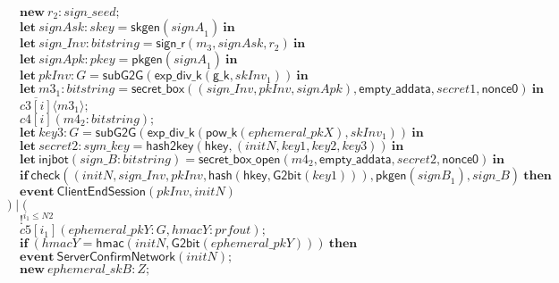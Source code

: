\documentclass{article}
\newcommand{\cinput}[2]{{#1}({#2})}
\newcommand{\coutput}[2]{\overline{#1}\langle{#2}\rangle}
\newcommand{\kw}[1]{\mathbf{#1}}
\newcommand{\kwf}[1]{\mathsf{#1}}
\newcommand{\var}[1]{\mathit{#1}}
\newcommand{\kwt}[1]{\mathit{#1}}
\newcommand{\kwp}[1]{\mathit{#1}}
\newcommand{\kwc}[1]{\mathit{#1}}
\begin{document}
\begin{tabbing}
\>$\quad \kw{new}\ \var{r}_{2}: \kwt{sign{\_}seed};$\\
\>$\quad \kw{let}\ \var{signAsk}: \kwt{skey} = \kwf{skgen}(\var{signA}_{1})\ \kw{in}$\\
\>$\quad \kw{let}\ \var{sign{\_}Inv}: \kwt{bitstring} = \kwf{sign{\_}r}(\var{m}_{3}, \var{signAsk}, \var{r}_{2})\ \kw{in}$\\
\>$\quad \kw{let}\ \var{signApk}: \kwt{pkey} = \kwf{pkgen}(\var{signA}_{1})\ \kw{in}$\\
\>$\quad \kw{let}\ \var{pkInv}: \kwt{G} = \kwf{subG2G}(\kwf{exp{\_}div{\_}k}(\kwf{g{\_}k}, \var{skInv}_{1}))\ \kw{in}$\\
\>$\quad \kw{let}\ \var{m3}_{1}: \kwt{bitstring} = \kwf{secret{\_}box}(\kwf{}(\var{sign{\_}Inv}, \var{pkInv}, \var{signApk}), \kwf{empty{\_}addata}, \var{secret1}, \kwf{nonce0})\ \kw{in}$\\
\>$\quad \coutput{\kwc{c3}[\var{i}]}{\var{m3}_{1}};$\\
\>$\quad \cinput{\kwc{c4}[\var{i}]}{\var{m4}_{2}: \kwt{bitstring}};$\\
\>$\quad \kw{let}\ \var{key3}: \kwt{G} = \kwf{subG2G}(\kwf{exp{\_}div{\_}k}(\kwf{pow{\_}k}(\var{ephemeral{\_}pkX}), \var{skInv}_{1}))\ \kw{in}$\\
\>$\quad \kw{let}\ \var{secret2}: \kwt{sym{\_}key} = \kwf{hash2key}(\kwf{hkey}, \kwf{}(\var{initN}, \var{key1}, \var{key2}, \var{key3}))\ \kw{in}$\\
\>$\quad \kw{let}\ \kwf{injbot}(\var{sign{\_}B}: \kwt{bitstring}) = \kwf{secret{\_}box{\_}open}(\var{m4}_{2}, \kwf{empty{\_}addata}, \var{secret2}, \kwf{nonce0})\ \kw{in}$\\
\>$\quad \kw{if}\ \kwf{check}(\kwf{}(\var{initN}, \var{sign{\_}Inv}, \var{pkInv}, \kwf{hash}(\kwf{hkey}, \kwf{G2bit}(\var{key1}))), \kwf{pkgen}(\var{signB}_{1}), \var{sign{\_}B})\ \kw{then}$\\
\>$\quad \kw{event}\ \kwf{ClientEndSession}(\var{pkInv}, \var{initN})$\\
\>$) \mid ($\\
\>$\quad !^{\var{i}_{1} \leq \kwp{N2}}$\\
\>$\quad \cinput{\kwc{c5}[\var{i}_{1}]}{\var{ephemeral{\_}pkY}: \kwt{G}, \var{hmacY}: \kwt{prfout}};$\\
\>$\quad \kw{if}\ (\var{hmacY}  =  \kwf{hmac}(\var{initN}, \kwf{G2bit}(\var{ephemeral{\_}pkY})))\ \kw{then}$\\
\>$\quad \kw{event}\ \kwf{ServerConfirmNetwork}(\var{initN});$\\
\>$\quad \kw{new}\ \var{ephemeral{\_}skB}: \kwt{Z};$\\

\end{tabbing}
\end{document}
